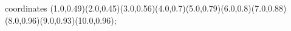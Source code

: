 					coordinates { (1.0,0.49)(2.0,0.45)(3.0,0.56)(4.0,0.7)(5.0,0.79)(6.0,0.8)(7.0,0.88)(8.0,0.96)(9.0,0.93)(10.0,0.96)};